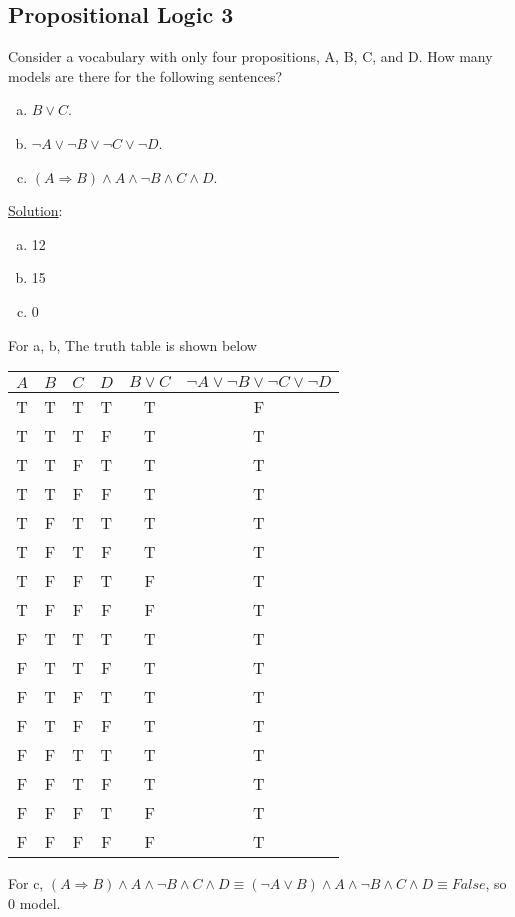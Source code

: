\documentclass[11pt, answers]{exam}
\begin{document}
%
%
\begin{questions}
\section{Propositional Logic 3}
\question

Consider a vocabulary with only four propositions, A, B, C, and D. How many models are there for the following sentences?

\begin{enumerate}[a.]
	\item $B \vee C$.
	\item $\neg A\vee \neg B\vee \neg C\vee \neg D$.
	\item $(A\Rightarrow B)\wedge A\wedge\neg B\wedge C\wedge D$.	
\end{enumerate}

\underline{Solution}:
\begin{enumerate}[a.]
	\item 12
	\item 15
	\item 0
\end{enumerate}
For a, b, The truth table is shown below
\begin{table}[htbp]
	\centering
	\begin{tabular}{|c|c|c|c|c|c|}\hline
		$A$ & $B$     & $C$   & $D$  & $B \vee C$ & $\neg A\vee \neg B\vee \neg C\vee \neg D$ \\ \hline
		T & T & T & T & T & F \\ \hline
		T & T & T & F & T & T \\ \hline
		T & T & F & T & T & T \\ \hline
		T & T & F & F & T & T \\ \hline
		T & F & T & T & T & T \\ \hline
		T & F & T & F & T & T \\ \hline
		T & F & F & T & F & T \\ \hline
		T & F & F & F & F & T \\ \hline
		F & T & T & T & T & T \\ \hline
		F & T & T & F & T & T \\ \hline
		F & T & F & T & T & T \\ \hline
		F & T & F & F & T & T \\ \hline
		F & F & T & T & T & T \\ \hline
		F & F & T & F & T & T \\ \hline
		F & F & F & T & F & T \\ \hline
		F & F & F & F & F & T \\ \hline
	\end{tabular}
\end{table}


For c, $(A\Rightarrow B)\wedge A\wedge\neg B\wedge C\wedge D \equiv (\neg A \vee B)\wedge A\wedge\neg B\wedge C\wedge D \equiv False$, so 0 model.
\end{questions}
\end{document}
